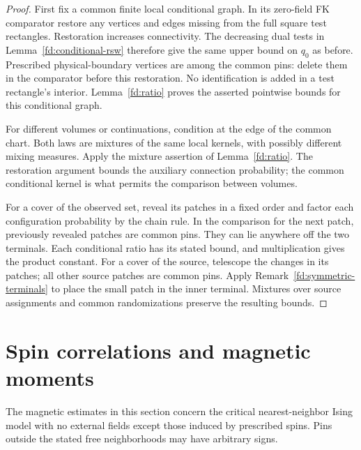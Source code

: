 \documentclass[11pt]{article}
\theoremstyle{definition}
\theoremstyle{remark}
\numberwithin{equation}{section}
\begin{document}
\begin{proof}
First fix a common finite local conditional graph. In its zero-field
FK comparator restore any vertices and edges missing from the full
square test rectangles. Restoration increases connectivity. The
decreasing dual tests in Lemma~\ref{fd:conditional-rsw} therefore give
the same upper bound on $q_0$ as before. Prescribed physical-boundary
vertices are among the common pins: delete them in the comparator
before this restoration. No identification is added in a test
rectangle's interior. Lemma~\ref{fd:ratio} proves the asserted
pointwise bounds for this conditional graph.

For different volumes or continuations, condition at the edge of the
common chart. Both laws are mixtures of the same local kernels, with
possibly different mixing measures. Apply the mixture assertion of
Lemma~\ref{fd:ratio}. The restoration argument bounds the auxiliary
connection probability; the common conditional kernel is what permits
the comparison between volumes.

For a cover of the observed set, reveal its patches in a fixed order
and factor each configuration probability by the chain rule. In the
comparison for the next patch, previously revealed patches are common
pins. They can lie anywhere off the two terminals. Each conditional
ratio has its stated bound, and multiplication gives the product
constant. For a cover of the source, telescope the changes in its
patches; all other source patches are common pins. Apply
Remark~\ref{fd:symmetric-terminals} to place the small patch in the
inner terminal. Mixtures over source assignments and common
randomizations preserve the resulting bounds.
\end{proof}

\section{Spin correlations and magnetic moments}\label{mo:section}

The magnetic estimates in this section concern the critical nearest-neighbor
Ising model with no external fields except those induced by prescribed spins.
Pins outside the stated free neighborhoods may have arbitrary signs.
\end{document}
